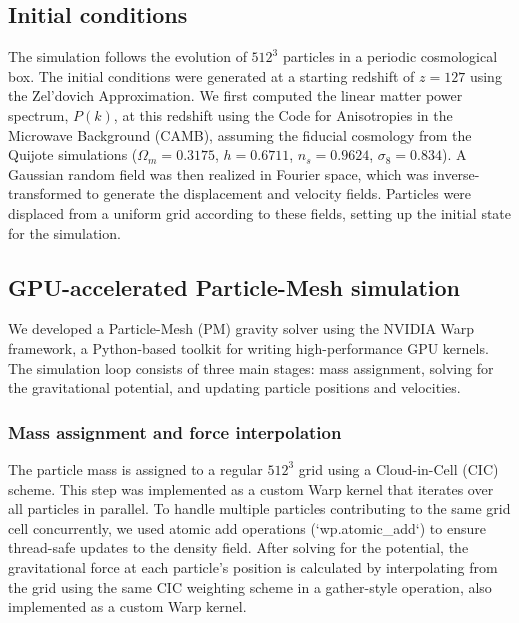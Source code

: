 \documentclass[]{article}
\begin{document}
\subsection{Initial conditions}
The simulation follows the evolution of $512^3$ particles in a periodic cosmological box. The initial conditions were generated at a starting redshift of $z=127$ using the Zel'dovich Approximation. We first computed the linear matter power spectrum, $P(k)$, at this redshift using the Code for Anisotropies in the Microwave Background (CAMB), assuming the fiducial cosmology from the Quijote simulations ($\Omega_m=0.3175$, $h=0.6711$, $n_s=0.9624$, $\sigma_8=0.834$). A Gaussian random field was then realized in Fourier space, which was inverse-transformed to generate the displacement and velocity fields. Particles were displaced from a uniform grid according to these fields, setting up the initial state for the simulation.

\subsection{GPU-accelerated Particle-Mesh simulation}
We developed a Particle-Mesh (PM) gravity solver using the NVIDIA Warp framework, a Python-based toolkit for writing high-performance GPU kernels. The simulation loop consists of three main stages: mass assignment, solving for the gravitational potential, and updating particle positions and velocities.

\subsubsection{Mass assignment and force interpolation}
The particle mass is assigned to a regular $512^3$ grid using a Cloud-in-Cell (CIC) scheme. This step was implemented as a custom Warp kernel that iterates over all particles in parallel. To handle multiple particles contributing to the same grid cell concurrently, we used atomic add operations (`wp.atomic\_add`) to ensure thread-safe updates to the density field. After solving for the potential, the gravitational force at each particle's position is calculated by interpolating from the grid using the same CIC weighting scheme in a gather-style operation, also implemented as a custom Warp kernel.
\end{document}
